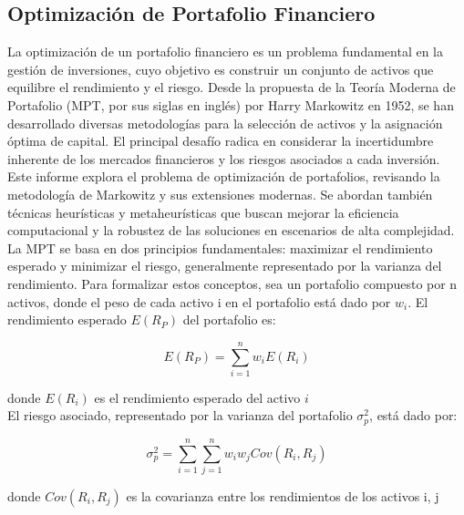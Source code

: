 \documentclass[9pt,a4paper,twoside]{rho-class/rho}
\begin{document}
        \subsection{Optimización de Portafolio Financiero}
            La optimización de un portafolio financiero es un problema fundamental en la gestión de inversiones, cuyo objetivo es construir un conjunto de activos que equilibre el rendimiento y el riesgo. Desde la propuesta de la Teoría Moderna de Portafolio (MPT, por sus siglas en inglés) por Harry Markowitz en 1952, se han desarrollado diversas metodologías para la selección de activos y la asignación óptima de capital. El principal desafío radica en considerar la incertidumbre inherente de los mercados financieros y los riesgos asociados a cada inversión.
            \\
            Este informe explora el problema de optimización de portafolios, revisando la metodología de Markowitz y sus extensiones modernas. Se abordan también técnicas heurísticas y metaheurísticas que buscan mejorar la eficiencia computacional y la robustez de las soluciones en escenarios de alta complejidad.
            \\
            La MPT se basa en dos principios fundamentales: maximizar el rendimiento esperado y minimizar el riesgo, generalmente representado por la varianza del rendimiento. Para formalizar estos conceptos, sea un portafolio compuesto por n activos, donde el peso de cada activo i en el portafolio está dado por ${w}_{i}$. El rendimiento esperado $E\left({R}_{P}\right)$ del portafolio es:
        
            \begin{equation}
                \label{ec:ecuacion1}
            E\left({R}_{P}\right)=\sum _{i=1}^{n}{w}_{i}E\left({R}_{i}\right)
            \end{equation}
        
            donde $E\left({R}_{i}\right)$ es el rendimiento esperado del activo $i$
            \\
            
            El riesgo asociado, representado por la varianza del portafolio ${\sigma }^{2}_{p}$, está dado por:
        
            \begin{equation}
            {\sigma }^{2}_{p}=\sum _{i=1}^{n}\sum _{j=1}^{n}{w}_{i}{w}_{j}Cov\left({R}_{i},{R}_{j}\right)
            \end{equation}
        
            donde $Cov\left({R}_{i},{R}_{j}\right)$ es la covarianza entre los rendimientos de los activos {i}, {j}
        
\end{document}
